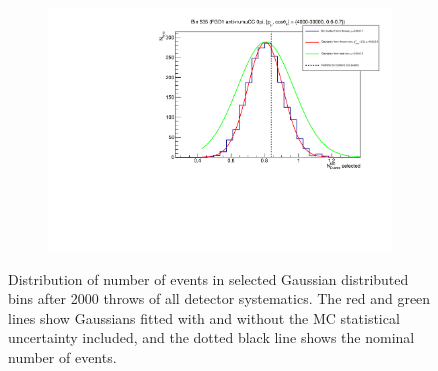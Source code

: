 \begin{figure}[h]
\begin{subfigure}{.49\textwidth}
\end{subfigure}
\begin{subfigure}{.49\textwidth}
  \centering
  \includegraphics[width=0.95\linewidth]{figs/detbin_allsysts535}
\end{subfigure}
\caption{Distribution of number of events in selected Gaussian distributed bins after 2000 throws of all detector systematics. The red and green lines show Gaussians fitted with and without the MC statistical uncertainty included, and the dotted black line shows the nominal number of events.}
\label{fig:detgaussbins}
\end{figure}

